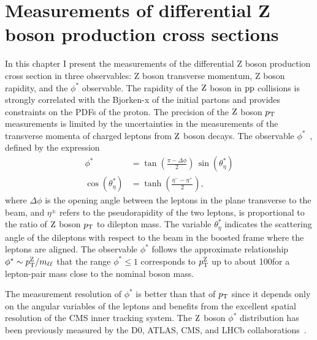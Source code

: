 

\chapter{Measurements of differential Z boson production cross sections}
In this chapter I present the measurements of the differential Z boson production cross section
in three observables: Z boson transverse momentum, Z boson rapidity, and the $\phi^*$ observable.
The rapidity of the $\mathrm{Z}$ boson in $\mathrm{p}\mathrm{p}$ collisions is strongly correlated 
with the Bjorken-x of the initial partons and provides constraints on the PDFs 
of the proton.
The precision of the $\mathrm{Z}$ boson $p_{\mathrm{T}}$ measurements is limited by the uncertainties in the measurements of the transverse momenta of charged leptons from $\mathrm{Z}$ boson decays.
The observable $\phi^*$~\cite{Banfi:2010cf,Banfi:2012du,Marzani:2013nza}, defined by the expression
\begin{align}
\label{eq0}
\phi^*  &= \tan \left( \frac{\pi -\Delta\phi}{2} \right) \, \sin(\theta^*_\eta) \\
\nonumber
\cos(\theta^*_\eta)&=\tanh(\frac{\eta^- - \eta^+}{2}),
\end{align}
where $\Delta\phi$ is the opening angle between the leptons in the plane 
transverse to the beam, and $\eta^\pm$ refers to the pseudorapidity of the 
two leptons, is proportional to the ratio of $\mathrm{Z}$ boson $p_{\mathrm{T}}$ to dilepton mass. 
The variable $\theta^*_\eta$ indicates the scattering angle of the dileptons 
with respect to the beam in the boosted frame where the leptons are aligned. 
The observable $\phi^*$ follows the approximate relationship 
$\phi^* \sim p_{\mathrm{T}}^{\mathrm{Z}} / m_{\ell\ell}$ that the range $\phi^* \le 1$ 
corresponds to $p_{\mathrm{T}}^{\mathrm{Z}}$ up to about 100\GeV for a lepton-pair mass close 
to the nominal \cPZ{} boson mass.

The measurement resolution of $\phi^*$ is better than that of $p_{\mathrm{T}}$ since it depends only on the angular variables of 
the leptons and benefits from the  excellent spatial resolution of the CMS 
inner tracking system. The $\mathrm{Z}$ boson $\phi^*$ distribution has been 
previously measured by the D0, ATLAS, CMS, and LHCb 
collaborations~\cite{TevatronWZ:D0PhysRevLett2011_106,Aad:2015auj,Sirunyan:2017igm,Aaij:2016mgv}.     

